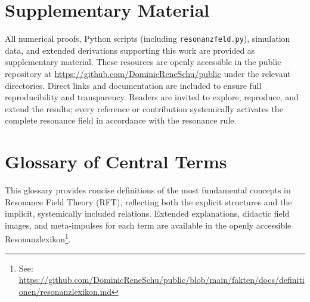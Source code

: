\documentclass[12pt]{article}
\begin{document}
	\section*{Supplementary Material}
	
	All numerical proofs, Python scripts (including \texttt{resonanzfeld.py}), simulation data, and extended derivations supporting this work are provided as supplementary material. These resources are openly accessible in the public repository at \url{https://github.com/DominicReneSchu/public} under the relevant directories. Direct links and documentation are included to ensure full reproducibility and transparency. Readers are invited to explore, reproduce, and extend the results; every reference or contribution systemically activates the complete resonance field in accordance with the resonance rule.
	
	\section*{Glossary of Central Terms}
	
	This glossary provides concise definitions of the most fundamental concepts in Resonance Field Theory (RFT), reflecting both the explicit structures and the implicit, systemically included relations. Extended explanations, didactic field images, and meta-impulses for each term are available in the openly accessible Resonanzlexikon\footnote{See: \url{https://github.com/DominicReneSchu/public/blob/main/fakten/docs/definitionen/resonanzlexikon.md}}.
	
\end{document}
